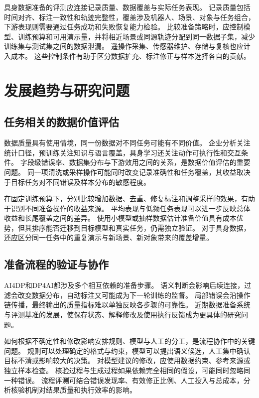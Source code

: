 具身数据准备的评测应连接记录质量、数据覆盖与实际任务表现。
记录质量包括时间对齐、标注一致性和轨迹完整性，覆盖涉及机器人、场景、对象与任务组合，下游表现则需要通过任务成功和失败恢复能力检验。
比较准备策略时，应控制模型、训练预算和可用演示量，并将相近场景或同源轨迹分配到同一数据子集，减少训练集与测试集之间的数据泄漏。
遥操作采集、传感器维护、存储与复核也应计入成本。
这些控制条件有助于区分数据扩充、标注修正与样本选择各自的贡献。

\section{发展趋势与研究问题}

\subsection{任务相关的数据价值评估}

数据质量具有使用情境，同一份数据对不同任务可能有不同价值。\cite{quality,zh_quality}
企业分析关注统计口径，预训练关注知识与语言覆盖，具身学习还关注动作可执行性和交互条件。
字段级错误率、数据集分布与下游效用之间的关系，是数据价值评估的重要问题。
同一项清洗或采样操作可能同时改变记录准确性和任务覆盖，其收益取决于目标任务对不同错误及样本分布的敏感程度。

在固定训练预算下，分别比较增加数据、去重、修复标注和调整采样的效果，有助于识别不同准备操作的收益来源。
平均表现与低频任务表现可以进一步反映总体收益和长尾覆盖之间的差异。
使用小模型或抽样数据估计准备价值具有成本优势，但其排序能否迁移到目标模型和真实任务，仍需独立验证。
对于具身数据，还应区分同一任务中的重复演示与新场景、新对象带来的覆盖增量。

\subsection{准备流程的验证与协作}

AI4DP和DP4AI都涉及多个相互依赖的准备步骤。
语义判断会影响后续连接，过滤会改变数据分布，自动标注又可能成为下一轮训练的监督。
局部错误会沿操作链传播，最终输出的质量指标难以单独反映各步骤的可靠性。
近期数据准备系统与评测基准的发展，使保存状态、解释修改及使用执行反馈成为更具体的研究问题。\cite{autoprep,deepprep,prepbench}

如何根据不确定性和修改影响安排规则、模型与人工的分工，是流程协作中的关键问题。
规则可以处理确定的格式与约束，模型可以提出语义候选，人工集中确认目标不清或影响较大的决策。
对模型建议的修改，应使用数据约束、参考来源或独立样本检查。
核验过程与生成过程如果依赖完全相同的假设，可能同时忽略同一种错误。
流程评测可结合错误发现率、有效修正比例、人工投入与总成本，分析核验机制对结果质量和执行效率的影响。


